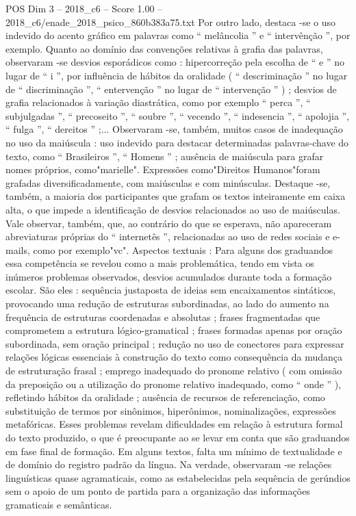 \begin{textsample}{POS Dim 3 – 2018\_c6 – Score 1.00 – 2018\_c6/enade\_2018\_psico\_860b383a75.txt}
Por outro lado, destaca -se o uso indevido do acento gráfico em palavras como “ melâncolia ” e “ intervênção ”, por exemplo.
Quanto ao domínio das convenções relativas à grafia das palavras, observaram -se desvios esporádicos como : hipercorreção pela escolha de “ e ” no lugar de “ i ”, por influência de hábitos da oralidade ( “ descriminação ” no lugar de “ discriminação ”, “ entervenção ” no lugar de “ intervenção ” ) ; desvios de grafia relacionados à variação diastrática, como por exemplo “ perca ”, “ subjulgadas ”, “ precoseito ”, “ soubre ”, “ vecendo ”, “ indesencia ”, “ apolojia ”, “ fulga ”, “ dereitos ” ;...
Observaram -se, também, muitos casos de inadequação no uso da maiúscula : uso indevido para destacar determinadas palavras-chave do texto, como “ Brasileiros ”, “ Homens ” ; ausência de maiúscula para grafar nomes próprios, como"marielle".
Expressões como"Direitos Humanos"foram grafadas diversificadamente, com maiúsculas e com minúsculas.
Destaque -se, também, a maioria dos participantes que grafam os textos inteiramente em caixa alta, o que impede a identificação de desvios relacionados ao uso de maiúsculas.
Vale observar, também, que, ao contrário do que se esperava, não apareceram abreviaturas próprias do “ internetês ”, relacionadas ao uso de redes sociais e e-mails, como por exemplo"vc".
Aspectos textuais : Para alguns dos graduandos essa competência se revelou como a mais problemática, tendo em vista os inúmeros problemas observados, desvios acumulados durante toda a formação escolar.
São eles : sequência justaposta de ideias sem encaixamentos sintáticos, provocando uma redução de estruturas subordinadas, ao lado do aumento na frequência de estruturas coordenadas e absolutas ; frases fragmentadas que comprometem a estrutura lógico-gramatical ; frases formadas apenas por oração subordinada, sem oração principal ; redução no uso de conectores para expressar relações lógicas essenciais à construção do texto como consequência da mudança de estruturação frasal ; emprego inadequado do pronome relativo ( com omissão da preposição ou a utilização do pronome relativo inadequado, como “ onde ” ), refletindo hábitos da oralidade ; ausência de recursos de referenciação, como substituição de termos por sinônimos, hiperônimos, nominalizações, expressões metafóricas.
Esses problemas revelam dificuldades em relação à estrutura formal do texto produzido, o que é preocupante ao se levar em conta que são graduandos em fase final de formação.
Em alguns textos, falta um mínimo de textualidade e de domínio do registro padrão da língua.
Na verdade, observaram -se relações linguísticas quase agramaticais, como as estabelecidas pela sequência de gerúndios sem o apoio de um ponto de partida para a organização das informações gramaticais e semânticas.

\end{textsample}
